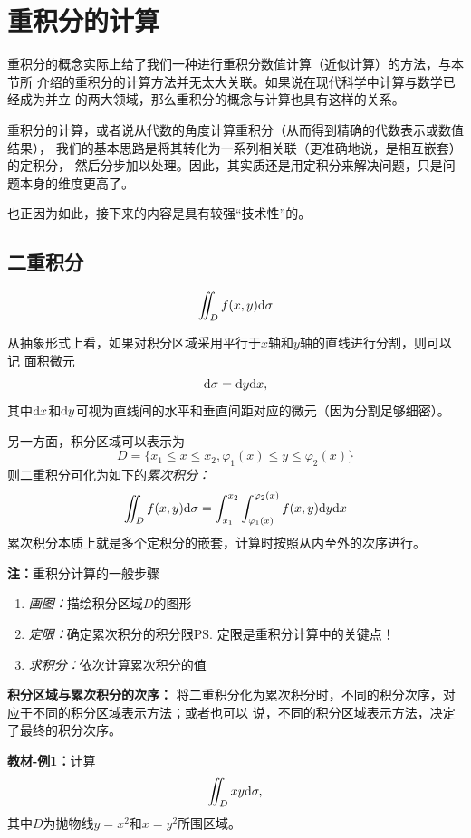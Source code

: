 \section{重积分的计算}


重积分的概念实际上给了我们一种进行重积分数值计算（近似计算）的方法，与本节所
介绍的重积分的计算方法并无太大关联。如果说在现代科学中计算与数学已经成为并立
的两大领域，那么重积分的概念与计算也具有这样的关系。

重积分的计算，或者说从代数的角度计算重积分（从而得到精确的代数表示或数值结果），
我们的基本思路是将其转化为一系列相关联（更准确地说，是相互嵌套）的定积分，
然后分步加以处理。因此，其实质还是用定积分来解决问题，只是问题本身的维度更高了。

也正因为如此，接下来的内容是具有较强“技术性”的。

\subsection{二重积分}

$$\iint_Df(x,y)\mathrm{d}\sigma
$$

从抽象形式上看，如果对积分区域采用平行于$x$轴和$y$轴的直线进行分割，则可以记
面积微元
$$\mathrm{d}\sigma=\mathrm{d} y\mathrm{d} x,$$
其中$\mathrm{d} x$和$\mathrm{d} y$可视为直线间的水平和垂直间距对应的微元（因为分割足够细密）。

另一方面，积分区域可以表示为
$$D=\{x_1\leq x\leq x_2,\varphi_1(x)\leq y\leq \varphi_2(x)\}$$
则二重积分可化为如下的{\it 累次积分：}
$${\iint_Df(x,y)\mathrm{d}\sigma=\int_{x_1}^{x_2}
\int_{\varphi_1(x)}^{\varphi_2(x)}f(x,y)\mathrm{d} y\mathrm{d} x}$$
累次积分本质上就是多个定积分的嵌套，计算时按照从内至外的次序进行。

{\bf 注：}重积分计算的一般步骤
\begin{enumerate}[Step-1]
  \setlength{\itemindent}{1cm}
  \item {\it 画图：}描绘积分区域$D$的图形 
  \item {\it 定限：}确定累次积分的积分限\ps{定限是重积分计算中的关键点！}
  \item {\it 求积分：}依次计算累次积分的值 
\end{enumerate}

{\bf 积分区域与累次积分的次序：}
将二重积分化为累次积分时，不同的积分次序，对应于不同的积分区域表示方法；或者也可以
说，不同的积分区域表示方法，决定了最终的积分次序。

{\bf 教材-例1：}计算
$$\iint_Dxy\mathrm{d}\sigma,$$
其中$D$为抛物线$y=x^2$和$x=y^2$所围区域。

